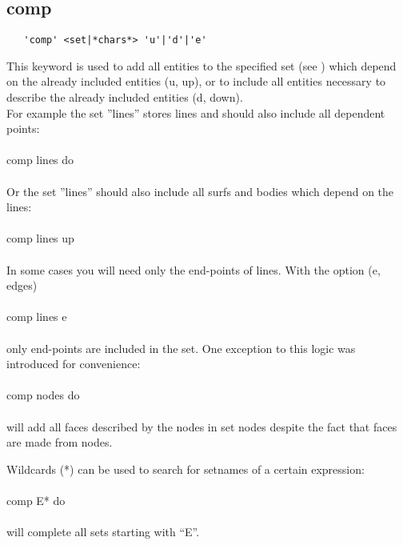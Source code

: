 \documentclass{article}
\begin{document}
\subsection{\label{comp}comp}
\begin{verbatim}
   'comp' <set|*chars*> 'u'|'d'|'e'
\end{verbatim}
This keyword is used to add all entities to the specified set (see ) which depend on the already included entities (u, up), or to include all entities necessary to describe the already included entities (d, down).\\For example the set ''lines'' stores lines and should also include all dependent points:\\\\comp lines do\\\\Or the set ''lines'' should also include all surfs and bodies which depend on the lines:\\\\comp lines up\\\\In some cases you will need only the end-points of lines. With the option (e, edges)\\\\comp lines e\\\\ only end-points are included in the set. One exception to this logic was introduced for convenience:\\\\comp nodes do\\\\will add all faces described by the nodes in set nodes despite the fact that faces are made from nodes.

Wildcards (*) can be used to search for setnames of a certain expression:\\\\comp E* do\\\\will complete all sets starting with ``E''.
\end{document}
